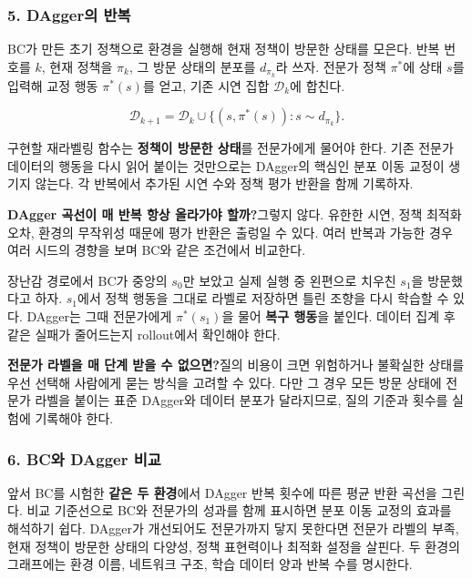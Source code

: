 \documentclass[11pt,a4paper]{article}
\begin{document}
\subsubsection{5. DAgger의 반복}

BC가 만든 초기 정책으로 환경을 실행해 현재 정책이 방문한 상태를 모은다. 반복 번호를 $k$, 현재 정책을 $\pi_k$, 그 방문 상태의 분포를 $d_{\pi_k}$라 쓰자. 전문가 정책 $\pi^*$에 상태 $s$를 입력해 교정 행동 $\pi^*(s)$를 얻고, 기존 시연 집합 $\mathcal D_k$에 합친다.\par

\[
\mathcal D_{k+1}=\mathcal D_k\cup
\{(s,\pi^*(s)):s\sim d_{\pi_k}\}.
\]

구현할 재라벨링 함수는 \textbf{정책이 방문한 상태}를 전문가에게 물어야 한다. 기존 전문가 데이터의 행동을 다시 읽어 붙이는 것만으로는 DAgger의 핵심인 분포 이동 교정이 생기지 않는다. 각 반복에서 추가된 시연 수와 정책 평가 반환을 함께 기록하자.\par

\par\medskip\noindent\textbf{DAgger 곡선이 매 반복 항상 올라가야 할까?}\quad 그렇지 않다. 유한한 시연, 정책 최적화 오차, 환경의 무작위성 때문에 평가 반환은 출렁일 수 있다. 여러 반복과 가능한 경우 여러 시드의 경향을 보며 BC와 같은 조건에서 비교한다.\par

장난감 경로에서 BC가 중앙의 $s_0$만 보았고 실제 실행 중 왼편으로 치우친 $s_1$을 방문했다고 하자. $s_1$에서 정책 행동을 그대로 라벨로 저장하면 틀린 조향을 다시 학습할 수 있다. DAgger는 그때 전문가에게 $\pi^*(s_1)$을 물어 \textbf{복구 행동}을 붙인다. 데이터 집계 후 같은 실패가 줄어드는지 rollout에서 확인해야 한다.\par

\par\medskip\noindent\textbf{전문가 라벨을 매 단계 받을 수 없으면?}\quad 질의 비용이 크면 위험하거나 불확실한 상태를 우선 선택해 사람에게 묻는 방식을 고려할 수 있다. 다만 그 경우 모든 방문 상태에 전문가 라벨을 붙이는 표준 DAgger와 데이터 분포가 달라지므로, 질의 기준과 횟수를 실험에 기록해야 한다.\par

\subsubsection{6. BC와 DAgger 비교}

앞서 BC를 시험한 \textbf{같은 두 환경}에서 DAgger 반복 횟수에 따른 평균 반환 곡선을 그린다. 비교 기준선으로 BC와 전문가의 성과를 함께 표시하면 분포 이동 교정의 효과를 해석하기 쉽다. DAgger가 개선되어도 전문가까지 닿지 못한다면 전문가 라벨의 부족, 현재 정책이 방문한 상태의 다양성, 정책 표현력이나 최적화 설정을 살핀다. 두 환경의 그래프에는 환경 이름, 네트워크 구조, 학습 데이터 양과 반복 수를 명시한다.\par
\end{document}
